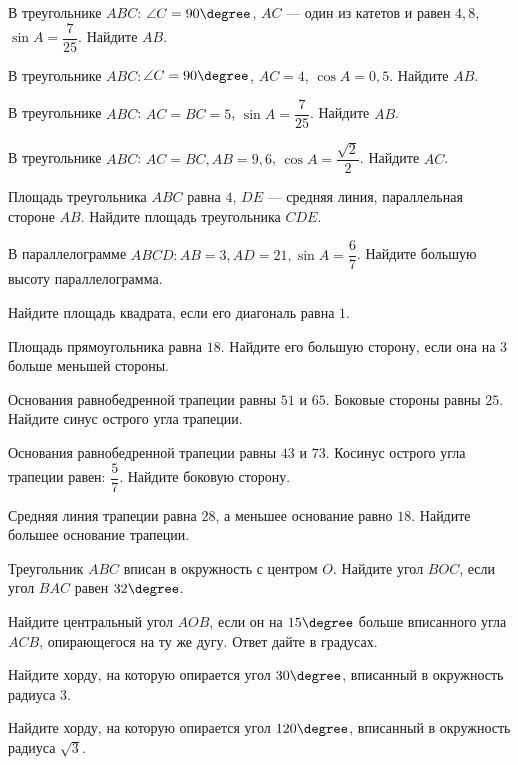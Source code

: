 \begin{class}[number=7]
	\begin{listofex}
		\item В треугольнике \(ABC\): \(\angle C=90\degree \), \(AC\) --- один из катетов и равен \(4,8\), \(\sin A = \dfrac{ 7 }{ 25 }\). Найдите \(AB\).
		\item В треугольнике \(ABC\): \( \angle C =90\degree\), \(AC  = 4\), \(\cos A = 0,5\). Найдите \(AB\).
		\item В треугольнике \(ABC\): \(AC=BC=5\), \(\sin A = \dfrac{ 7 }{ 25 }\). Найдите \(AB\).
		\item В треугольнике \(ABC\): \(AC=BC, AB=9,6\), \(\cos A = \dfrac{ \sqrt{2} }{ 2 }\). Найдите \(AC\).
		\item Площадь треугольника \(ABC\) равна \(4\), \(DE\) --- средняя линия, параллельная стороне \(AB\). Найдите площадь треугольника \(CDE\).
		\item В параллелограмме \(ABCD: AB=3, AD=21, \sin A = \dfrac{ 6 }{ 7 }\). Найдите большую высоту параллелограмма.
		\item Найдите площадь квадрата, если его диагональ равна \(1\).
		\item Площадь прямоугольника равна \(18\). Найдите его большую сторону, если она на 3 больше меньшей стороны.
		\item Основания равнобедренной трапеции равны \(51\) и \(65\). Боковые стороны равны \(25\). Найдите синус острого угла трапеции.
		\item Основания равнобедренной трапеции равны \(43\) и \(73\). Косинус острого угла трапеции равен: \(\dfrac{ 5 }{ 7 }\).  Найдите боковую сторону.
		\item Средняя линия трапеции равна \(28\), а меньшее основание равно \(18\). Найдите большее основание трапеции.
		\item Треугольник \(ABC\) вписан в окружность с центром \(O\). Найдите угол \(BOC\), если угол \(BAC\) равен \(32 \degree \).
		\item Найдите центральный угол \(AOB\), если он на \(15 \degree\) больше вписанного угла \(ACB\), опирающегося на ту же дугу. Ответ дайте в градусах.
		\item Найдите хорду, на которую опирается угол \(30\degree\), вписанный в окружность радиуса \(3\).
		\item Найдите хорду, на которую опирается угол \(120\degree \), вписанный в окружность радиуса \(\sqrt{3}\).

\end{listofex}
\end{class}
